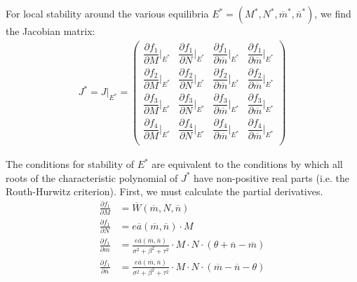\documentclass[12pt]{article}
\begin{document}
\noindent For local stability around the various equilibria $E^* = (M^*, N^*, \overline{m}^*, \overline{n}^*)$, we find the Jacobian matrix:
\begin{align*}
	J^* = J\big|_{E^*} = \left(
	\begin{array}{cccc}
		\dfrac{\partial f_1}{\partial M}\bigg|_{E^*} & \dfrac{\partial f_1}{\partial N}\bigg|_{E^*} & \dfrac{\partial f_1}{\partial \overline{m}}\bigg|_{E^*} & \dfrac{\partial f_1}{\partial \overline{m}}\bigg|_{E^*} \\[.4cm]
		\dfrac{\partial f_2}{\partial M}\bigg|_{E^*} & \dfrac{\partial f_2}{\partial N}\bigg|_{E^*} & \dfrac{\partial f_2}{\partial \overline{m}}\bigg|_{E^*} & \dfrac{\partial f_2}{\partial \overline{m}}\bigg|_{E^*} \\[.4cm]
		\dfrac{\partial f_3}{\partial M}\bigg|_{E^*} & \dfrac{\partial f_3}{\partial N}\bigg|_{E^*} & \dfrac{\partial f_3}{\partial \overline{m}}\bigg|_{E^*} & \dfrac{\partial f_3}{\partial \overline{m}}\bigg|_{E^*} \\[.4cm]
		\dfrac{\partial f_4}{\partial M}\bigg|_{E^*} & \dfrac{\partial f_4}{\partial N}\bigg|_{E^*} & \dfrac{\partial f_4}{\partial \overline{m}}\bigg|_{E^*} & \dfrac{\partial f_4}{\partial \overline{m}}\bigg|_{E^*} \\
	\end{array}
	\right)
\end{align*}

\noindent The conditions for stability of $E^*$ are equivalent to the conditions by which all roots of the characteristic polynomial of $J^*$ have non-positive real parts (i.e. the Routh-Hurwitz criterion).  First, we must calculate the partial derivatives. \\
\begin{align*}
	\frac{\partial f_1}{\partial M} &= \overline{W}(\overline{m}, N, \overline{n}) \\[.15cm]
	\frac{\partial f_1}{\partial N} &= e\overline{a}(\overline{m}, \overline{n}) \cdot M \\[.15cm]
	\frac{\partial f_1}{\partial \overline{m}} &= \frac{e\overline{a}(\overline{m}, \overline{n})}{\sigma^2 + \beta^2 + \tau^2} \cdot M \cdot N \cdot (\theta + \overline{n} - \overline{m}) \\[.15cm]
	\frac{\partial f_1}{\partial \overline{n}} &= \frac{e\overline{a}(\overline{m}, \overline{n})}{\sigma^2 + \beta^2 + \tau^2} \cdot M \cdot N \cdot (\overline{m} - \overline{n} - \theta)
\end{align*}
\end{document}
